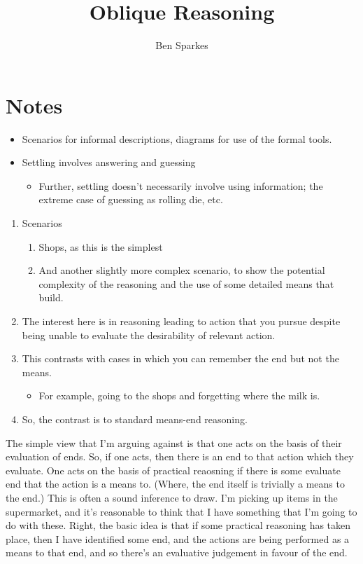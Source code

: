 \documentclass[10pt]{article}
\title{Oblique Reasoning}
\author{Ben Sparkes}
\begin{document}
\section*{Notes}



\begin{itemize}
\item Scenarios for informal descriptions, diagrams for use of the formal tools.
\item Settling involves answering and guessing
  \begin{itemize}
  \item Further, settling doesn't necessarily involve using information; the extreme case of guessing as rolling die, etc.
  \end{itemize}
\end{itemize}

\newpage

\begin{enumerate}
\item Scenarios
  \begin{enumerate}
  \item Shops, as this is the simplest
  \item And another slightly more complex scenario, to show the potential complexity of the reasoning and the use of some detailed means that build.
  \end{enumerate}
\item The interest here is in reasoning leading to action that you pursue despite being unable to evaluate the desirability of relevant action.
\item This contrasts with cases in which you can remember the end but not the means.
  \begin{itemize}
  \item For example, going to the shops and forgetting where the milk is.
  \end{itemize}
\item So, the contrast is to standard means-end reasoning.
\end{enumerate}



The simple view that I'm arguing against is that one acts on the basis of their evaluation of ends.
So, if one acts, then there is an end to that action which they evaluate.
One acts on the basis of practical reaosning if there is some evaluate end that the action is a means to.
(Where, the end itself is trivially a means to the end.)
This is often a sound inference to draw.
I'm picking up items in the supermarket, and it's reasonable to think that I have something that I'm going to do with these.
Right, the basic idea is that if some practical reasoning has taken place, then I have identified some end, and the actions are being performed as a means to that end, and so there's an evaluative judgement in favour of the end.
\end{document}
